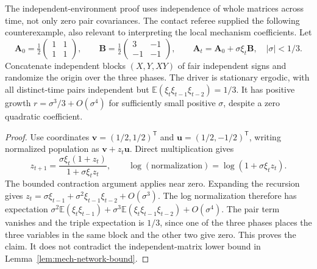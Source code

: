 \begin{remark}\label{rem:mech-third-order}
The independent-environment proof uses independence of whole matrices across time, not only zero pair covariances. The contact referee supplied the following counterexample, also relevant to interpreting the local mechanism coefficients. Let
\[
 \mathbf A_0=\tfrac12\begin{pmatrix}1&1\\1&1\end{pmatrix},\qquad
 \mathbf B=\tfrac12\begin{pmatrix}3&-1\\-1&-1\end{pmatrix},\qquad
 \mathbf A_t=\mathbf A_0+\sigma\xi_t\mathbf B,\quad |\sigma|<1/3.
\]
Concatenate independent blocks \((X,Y,XY)\) of fair independent signs and randomize the origin over the three phases. The driver is stationary ergodic, with all distinct-time pairs independent but \(\mathbb E(\xi_t\xi_{t-1}\xi_{t-2})=1/3\). It has positive growth \(r=\sigma^3/3+O(\sigma^4)\) for sufficiently small positive \(\sigma\), despite a zero quadratic coefficient.
\end{remark}
\begin{proof}
Use coordinates \(\mathbf v=(1/2,1/2)^{\mathsf T}\) and \(\mathbf u=(1/2,-1/2)^{\mathsf T}\), writing normalized population as \(\mathbf v+z_t\mathbf u\). Direct multiplication gives
\[
 z_{t+1}=\frac{\sigma\xi_t(1+z_t)}{1+\sigma\xi_tz_t},
 \qquad \log(\text{normalization})=\log(1+\sigma\xi_tz_t).
\]
The bounded contraction argument applies near zero. Expanding the recursion gives
\(z_t=\sigma\xi_{t-1}+\sigma^2\xi_{t-1}\xi_{t-2}+O(\sigma^3)\).
The log normalization therefore has expectation
\(\sigma^2\mathbb E(\xi_t\xi_{t-1})+
\sigma^3\mathbb E(\xi_t\xi_{t-1}\xi_{t-2})+O(\sigma^4)\).
The pair term vanishes and the triple expectation is \(1/3\), since one of the three phases places the three variables in the same block and the other two give zero. This proves the claim. It does not contradict the independent-matrix lower bound in Lemma~\ref{lem:mech-network-bound}.
\end{proof}
